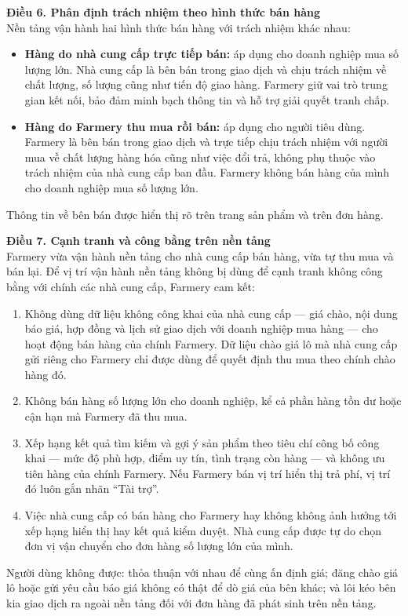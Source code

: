 \noindent\textbf{Điều 6. Phân định trách nhiệm theo hình thức bán hàng}\\
Nền tảng vận hành hai hình thức bán hàng với trách nhiệm khác nhau:
\begin{itemize}
    \item \textbf{Hàng do nhà cung cấp trực tiếp bán:} áp dụng cho doanh nghiệp
    mua số lượng lớn. Nhà cung cấp là bên bán trong giao dịch và chịu trách
    nhiệm về chất lượng, số lượng cũng như tiến độ giao hàng. Farmery giữ vai
    trò trung gian kết nối, bảo đảm minh bạch thông tin và hỗ trợ giải quyết
    tranh chấp.
    \item \textbf{Hàng do Farmery thu mua rồi bán:} áp dụng cho người tiêu dùng.
    Farmery là bên bán trong giao dịch và trực tiếp chịu trách nhiệm với người
    mua về chất lượng hàng hóa cũng như việc đổi trả, không phụ thuộc vào trách
    nhiệm của nhà cung cấp ban đầu. Farmery không bán hàng của mình cho doanh
    nghiệp mua số lượng lớn.
\end{itemize}
Thông tin về bên bán được hiển thị rõ trên trang sản phẩm và trên đơn hàng.

\noindent\textbf{Điều 7. Cạnh tranh và công bằng trên nền tảng}\\
Farmery vừa vận hành nền tảng cho nhà cung cấp bán hàng, vừa tự thu mua và
bán lại. Để vị trí vận hành nền tảng không bị dùng để cạnh tranh không công
bằng với chính các nhà cung cấp, Farmery cam kết:
\begin{enumerate}
    \item Không dùng dữ liệu không công khai của nhà cung cấp --- giá chào, nội
    dung báo giá, hợp đồng và lịch sử giao dịch với doanh nghiệp mua hàng ---
    cho hoạt động bán hàng của chính Farmery. Dữ liệu chào giá lô mà nhà cung cấp
    gửi riêng cho Farmery chỉ được dùng để quyết định thu mua theo chính chào
    hàng đó.
    \item Không bán hàng số lượng lớn cho doanh nghiệp, kể cả phần hàng tồn dư
    hoặc cận hạn mà Farmery đã thu mua.
    \item Xếp hạng kết quả tìm kiếm và gợi ý sản phẩm theo tiêu chí công bố
    công khai --- mức độ phù hợp, điểm uy tín, tình trạng còn hàng --- và không
    ưu tiên hàng của chính Farmery. Nếu Farmery bán vị trí hiển thị trả phí,
    vị trí đó luôn gắn nhãn ``Tài trợ''.
    \item Việc nhà cung cấp có bán hàng cho Farmery hay không không ảnh hưởng
    tới xếp hạng hiển thị hay kết quả kiểm duyệt. Nhà cung cấp được tự do chọn
    đơn vị vận chuyển cho đơn hàng số lượng lớn của mình.
\end{enumerate}
Người dùng không được: thỏa thuận với nhau để cùng ấn định giá; đăng chào giá lô
hoặc gửi yêu cầu báo giá không có thật để dò giá của bên khác; và lôi kéo bên
kia giao dịch ra ngoài nền tảng đối với đơn hàng đã phát sinh trên nền tảng.

